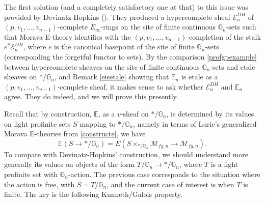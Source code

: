 \documentclass[12pt]{article}
\begin{document}
The first solution (and a completely satisfactory one at that) to this issue was provided by Devinatz-Hopkins (\cite{DevinatzE}).  They produced a hypercomplete sheaf $\mathcal{E}_n^{DH}$ of $(p,v_1,\ldots,v_{n-1})$-complete $E_\infty$-rings on the site of finite continuous $\mathbb{G}_n$-sets such that Morava E-theory identifies with the $(p,v_1,\ldots,v_{n-1})$-completion of the stalk $e^\ast \mathcal{E}_n^{DH}$, where $e$ is the canonical basepoint of the site of finite $\mathbb{G}_n$-sets (corresponding the forgetful functor to sets).  By the comparison \ref{profgpexample} between hypercomplete sheaves on the site of finite continuous $\mathbb{G}_n$-sets and etale sheaves on $\ast/\mathbb{G}_n$, and Remark \ref{eisetale} showing that $\mathbb{E}_n$ is etale as a $(p,v_1,\ldots,v_{n-1})$-complete sheaf, it makes sense to ask whether $\mathcal{E}_n^{DH}$ and $\mathbb{E}_n$ agree.  They do indeed, and we will prove this presently.

Recall that by construction, $\mathbb{E}$, as a $v$-sheaf on $\ast/\mathbb{G}_n$, is determined by its values on light profinite sets $S$ mapping to $\ast/\mathbb{G}_n$, namely in terms of Lurie's generalized Morava E-theories from \ref{constructe}, we have
$$\mathbb{E}(S\to\ast/\mathbb{G}_n) = E(S\times_{\ast/\mathbb{G}_n} \mathcal{M}_{fg,n} \to \mathcal{M}_{fg,n}).$$
To compare with Devinatz-Hopkins' construction, we should understand more generally its values on objects of the form $T/\mathbb{G}_n \to \ast/\mathbb{G}_n$, where $T$ is a light profinite set with $\mathbb{G}_n$-action.  The previous case corresponds to the situation where the action is free, with $S=T/\mathbb{G}_n$, and the current case of interest is when $T$ is finite.  The key is the following Kunneth/Galois property.
\end{document}
